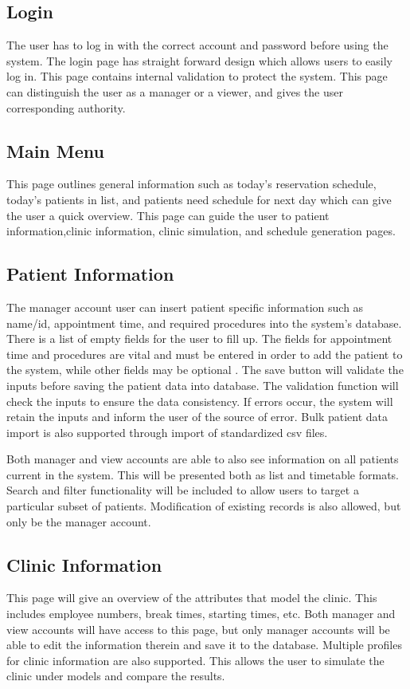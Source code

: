 \documentclass[12pt]{article}
\begin{document}
\subsection{Login}
The user has to log in with the correct account and password before using the system. The login page has straight forward design which allows users to easily log in. This page contains internal validation to protect the system. This page can distinguish the user as a manager or a viewer, and gives the user corresponding authority. 

\subsection{Main Menu}
This page outlines general information such as today’s reservation schedule, today’s patients in list, and patients need schedule for next day which can give the user a quick overview. This page can guide the user to patient information,clinic information, clinic simulation, and schedule generation pages.

\subsection{Patient Information}
The manager account user can insert patient specific information such as name/id, appointment time, and required procedures into the system’s database. There is a list of empty fields for the user to fill up. The fields for appointment time and procedures are vital and must be entered in order to add the patient to the system, while other fields may be optional . The save button will validate the inputs before saving the patient data into database. The validation function will check the inputs to ensure the data consistency. If errors occur, the system will retain the inputs and inform the user of the source of error. Bulk patient data import is also supported through import of standardized csv files.

\noindent \newline
Both manager and view accounts are able to also see information on all patients current in the system. This will be presented both as list and timetable formats. Search and filter functionality will be included to allow users to target a particular subset of patients. Modification of existing records is also allowed, but only be the manager account.

\subsection{Clinic Information}
This page will give an overview of the attributes that model the clinic. This includes employee numbers, break times, starting times, etc. Both manager and view accounts will have access to this page, but only manager accounts will be able to edit the information therein and save it to the database. Multiple profiles for clinic information are also supported. This allows the user to simulate the clinic under models and compare the results.
\end{document}
